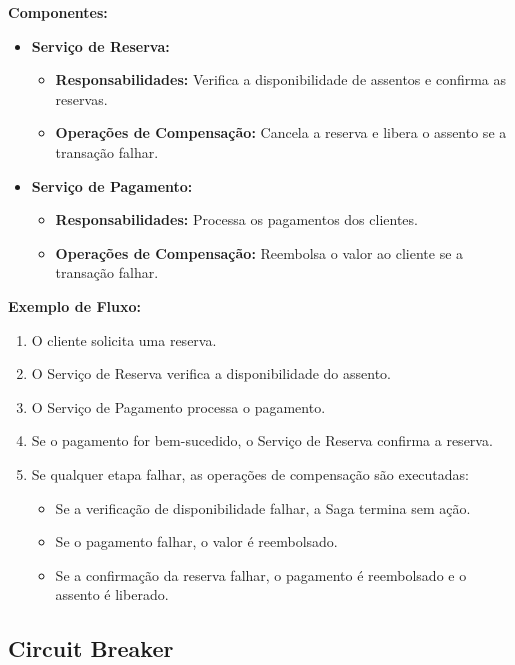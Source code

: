 \textbf{Componentes:}

\begin{itemize}
    \item \textbf{Serviço de Reserva:}
    \begin{itemize}
        \item \textbf{Responsabilidades:} Verifica a disponibilidade de assentos e confirma as reservas.
        \item \textbf{Operações de Compensação:} Cancela a reserva e libera o assento se a transação falhar.
    \end{itemize}

    \item \textbf{Serviço de Pagamento:}
    \begin{itemize}
        \item \textbf{Responsabilidades:} Processa os pagamentos dos clientes.
        \item \textbf{Operações de Compensação:} Reembolsa o valor ao cliente se a transação falhar.
    \end{itemize}
\end{itemize}

\textbf{Exemplo de Fluxo:}

\begin{enumerate}
    \item O cliente solicita uma reserva.
    \item O Serviço de Reserva verifica a disponibilidade do assento.
    \item O Serviço de Pagamento processa o pagamento.
    \item Se o pagamento for bem-sucedido, o Serviço de Reserva confirma a reserva.
    \item Se qualquer etapa falhar, as operações de compensação são executadas:
    \begin{itemize}
        \item Se a verificação de disponibilidade falhar, a Saga termina sem ação.
        \item Se o pagamento falhar, o valor é reembolsado.
        \item Se a confirmação da reserva falhar, o pagamento é reembolsado e o assento é liberado.
    \end{itemize}
\end{enumerate}

\subsection{Circuit Breaker}

